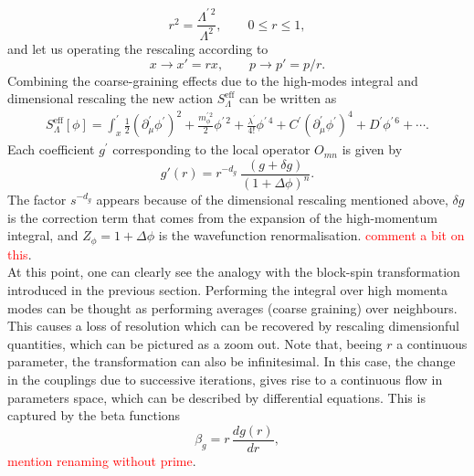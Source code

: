 \begin{equation*}
    r^2 = \frac{\Lambda^{\prime \, 2}}{\Lambda^2}, \qquad 0 \leq r \leq 1,
\end{equation*}
and let us operating the rescaling according to
\begin{equation*}
    x \to x' = rx, \qquad p \to p' = p/r.
\end{equation*}
Combining the coarse-graining effects due to the high-modes integral and dimensional rescaling the new action $S^\text{eff}_\Lambda$ can be written as \cite{Peskin:1995ev}
\begin{equation*} 
    \begin{aligned} 
        S^\text{eff}_\Lambda[\phi]=\int_x^\prime \frac{1}{2}\left(\partial_\mu^{\prime} \phi^{\prime}\right)^2 + \frac{m_\phi^{\prime \, 2}}{2} \phi^{\prime \, 2}  + \frac{\lambda^\prime}{4 !} \phi^{\prime \, 4}+C^{\prime}\left(\partial_\mu^{\prime} \phi^{\prime}\right)^4+D^{\prime} \phi^{\prime \, 6}+\cdots.
    \end{aligned}
\end{equation*}
Each coefficient $g^\prime$ corresponding to the local operator $O_{mn}$ is given by
\begin{equation}
    g'(r) = r^{-d_g} \ \frac{(g + \delta g)}{(1 + \Delta\phi)^{n}}.
    \label{eq:couplings_redefinition}
\end{equation}
The factor  $s^{-d_g}$ appears because of the dimensional rescaling mentioned above, $\delta g$ is the correction term that comes from the expansion of the high-momentum integral, and $Z_\phi = 1 + \Delta\phi$ is the wavefunction renormalisation. \textcolor{red}{comment a bit on this}. \\
At this point, one can clearly see the analogy with the block-spin transformation introduced in the previous section. Performing the integral over high momenta modes can be thought as performing averages (coarse graining) over neighbours. This causes a loss of resolution which can be recovered by rescaling dimensionful quantities, which can be pictured as a zoom out.
Note that, beeing $r$ a continuous parameter, the transformation can also be infinitesimal. In this case, the change in the couplings due to successive iterations, gives rise to a continuous flow in parameters space, which can be described by differential equations. This is captured by the beta functions 
\begin{equation*}
    \beta_g = r \, \frac{dg(r)}{dr},
\end{equation*}
\textcolor{red}{mention renaming without prime}. \\
